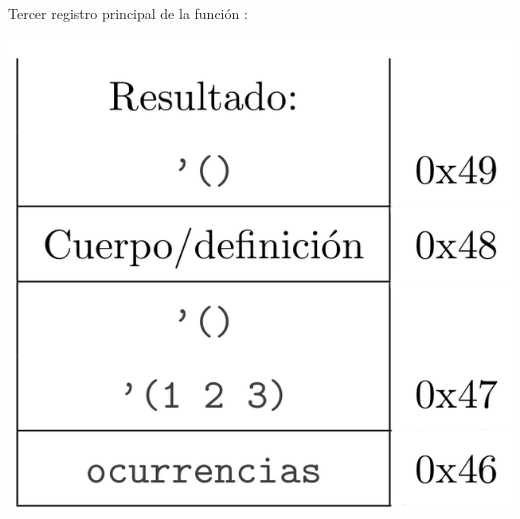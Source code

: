 Tercer registro principal de la función :

\begin{center}
        \includegraphics[scale=0.3]{./R11}
\end{center}


